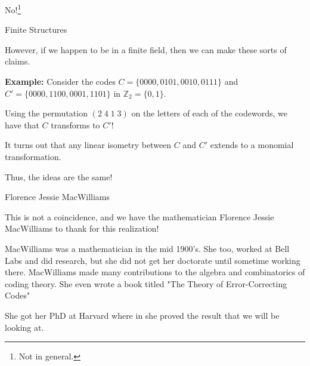 \documentclass{beamer}
\begin{document}
\begin{frame}
    
    \begin{center}
        No!\footnote{Not in general.}
    \end{center}

\end{frame}

\begin{frame}{Finite Structures}
    
    However, if we happen to be in a finite field, then we can make these sorts of claims.

    \medskip

    \pause

    \textbf{Example:} Consider the codes $C=\{0000,0101,0010,0111\}$ and $C'=\{0000,1100,0001,1101\}$ in
    $\mathbb{Z}_2=\{0,1\}$.

    \medskip

    \pause

    Using the permutation $(2\;4\;1\;3)$ on the letters of each of the codewords, we have that $C$
    transforms to $C'$!
    
    \bigskip

    \pause

    It turns out that any linear isometry between $C$ and $C'$ extends to a monomial transformation.\\

    \pause

    Thus, the ideas are the same!

\end{frame}

\begin{frame}{Florence Jessie MacWilliams}
    
    This is not a coincidence, and we have the mathematician Florence Jessie MacWilliams to thank for
    this realization!

    \medskip
    
    \pause

    MacWilliams was a mathematician in the mid 1900's. She too, worked at Bell Labs and did research,
    but she did not get her doctorate until sometime working there. MacWilliams made many contributions
    to the algebra and combinatorics of coding theory. She even wrote a book titled "The Theory of
    Error-Correcting Codes"
    
    \bigskip

    She got her PhD at Harvard where in she proved the result that we will be looking at.

\end{frame}
\end{document}
